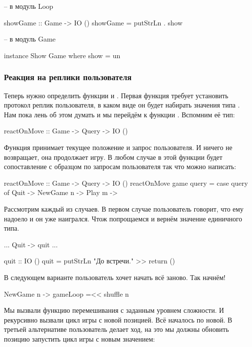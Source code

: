 \begin{code}
-- в модуль Loop

showGame :: Game -> IO ()
showGame = putStrLn . show 

-- в модуль Game

instance Show Game where
    show = un
\end{code}

\subsubsection{Реакция на реплики пользователя}

Теперь нужно определить функции  и 
. Первая функция требует установить 
протокол реплик пользователя, в каком виде он будет
набирать значения типа . Нам пока лень об этом
думать и мы перейдём к функции .
Вспомним её тип:

\begin{code}
reactOnMove :: Game -> Query -> IO ()
\end{code}

Функция принимает текущее положение и запрос пользователя.
И ничего не возвращает, она продолжает игру. В любом случае в
этой функции будет сопоставление с образцом по запросам пользователя
так что можно написать:

\begin{code}
reactOnMove :: Game -> Query -> IO ()
reactOnMove game query = case query of
    Quit        -> 
    NewGame n   -> 
    Play    m   -> 
\end{code}

Рассмотрим каждый из случаев. В первом случае пользователь
говорит, что ему надоело и он уже наигрался. Чтож попрощаемся
и вернём значение единичного типа. 

\begin{code}
...
    Quit        -> quit
...

quit :: IO ()
quit = putStrLn "До встречи." >> return ()
\end{code}

В следующем варианте пользователь хочет начать всё заново.
Так начнём! 


\begin{code}
    NewGame n   -> gameLoop =<< shuffle n
\end{code}

Мы вызвали функцию перемешивания  с заданным
уровнем сложности. И рекурсивно вызвали цикл игры с новой
позицией. Всё началось по новой. В третьей альтернативе 
пользователь делает ход, на это мы должны обновить позицию
запустить цикл игры с новым значением:

